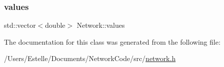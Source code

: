 \mbox{\label{classNetwork_ab4062dd3b2fc7825f21a686d76e3c696}} 
\subsubsection{\texorpdfstring{values}{values}}
{\footnotesize\ttfamily std\+::vector$<$double$>$ Network\+::values\hspace{0.3cm}{\ttfamily [private]}}



The documentation for this class was generated from the following file\+:\begin{DoxyCompactItemize}
\item 
/\+Users/\+Estelle/\+Documents/\+Network\+Code/src/\mbox{\hyperlink{network_8h}{network.\+h}}\end{DoxyCompactItemize}
